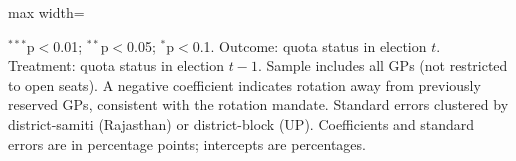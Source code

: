 \begin{adjustbox}{max width=\linewidth}
\begin{threeparttable}[b]
      \begin{tablenotes}
         \item $^{***}$p$<$0.01; $^{**}$p$<$0.05; $^{*}$p$<$0.1. Outcome: quota status in election $t$. Treatment: quota status in election $t-1$. Sample includes all GPs (not restricted to open seats). A negative coefficient indicates rotation away from previously reserved GPs, consistent with the rotation mandate. Standard errors clustered by district-samiti (Rajasthan) or district-block (UP). Coefficients and standard errors are in percentage points; intercepts are percentages.
      \end{tablenotes}
   \end{threeparttable}
\end{adjustbox}
\par\endgroup



